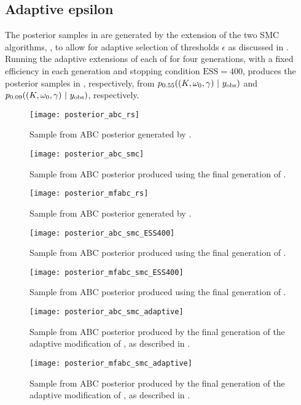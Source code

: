 \documentclass[demo,supplement,review]{siamonline190516}
\begin{document}
\subsection{Adaptive epsilon}
The posterior samples in  are generated by the extension of the two SMC algorithms, , to allow for adaptive selection of thresholds $\epsilon$ as discussed in .
Running the adaptive extensions of each of  for four generations, with a fixed efficiency in each generation and stopping condition $\mathrm{ESS}=400$, produces the posterior samples in , respectively, from $p_{0.55}((K, \omega_0, \gamma)~|~y_{\mathrm{obs}})$ and $p_{0.09}((K, \omega_0, \gamma)~|~y_{\mathrm{obs}})$, respectively.

\begin{figure*}[p]
\centering
\texttt{[image: posterior\_abc\_rs]}
\caption{
Sample from ABC posterior generated by .
}
\label{post:ABC:Rejection}
\end{figure*}

\begin{figure*}[p]
\centering
\texttt{[image: posterior\_abc\_smc]}
\caption{
Sample from ABC posterior produced using the final generation of .
}
\label{post:ABC:SMC}
\end{figure*}

\begin{figure*}[p]
\centering
\texttt{[image: posterior\_mfabc\_rs]}
\caption{
Sample from ABC posterior generated by .
}
\label{post:MFABC:Rejection}
\end{figure*}

\begin{figure*}[p]
\centering
\texttt{[image: posterior\_abc\_smc\_ESS400]}
\caption{
Sample from ABC posterior produced using the final generation of .
}
\label{post:ABC:SMC:ESS400}
\end{figure*}

\begin{figure*}[p]
\centering
\texttt{[image: posterior\_mfabc\_smc\_ESS400]}
\caption{
Sample from ABC posterior produced using the final generation of .
}
\label{post:MFABC:SMC:ESS400}
\end{figure*}


\begin{figure*}[p]
\centering
\texttt{[image: posterior\_abc\_smc\_adaptive]}
\caption{
Sample from ABC posterior produced by the final generation of the adaptive modification of , as described in .
}
\label{post:ABC:SMC:adaptive}
\end{figure*}

\begin{figure*}[p]
\centering
\texttt{[image: posterior\_mfabc\_smc\_adaptive]}
\caption{
Sample from ABC posterior produced by the final generation of the adaptive modification of , as described in .
}
\label{post:MFABC:SMC:adaptive}
\end{figure*}
\end{document}

